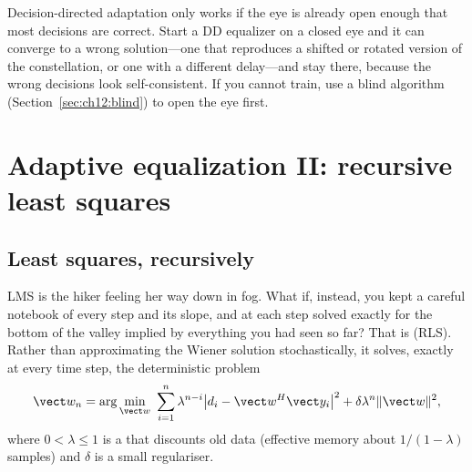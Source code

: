 
\begin{pitfall}
Decision-directed adaptation only works if the eye is already open enough that most decisions are
correct. Start a DD equalizer on a closed eye and it can converge to a wrong solution---one that
reproduces a shifted or rotated version of the constellation, or one with a different delay---and
stay there, because the wrong decisions look self-consistent. If you cannot train, use a blind
algorithm (Section~\ref{sec:ch12:blind}) to open the eye first.
\end{pitfall}

\section{Adaptive equalization II: recursive least squares}
\label{sec:ch12:rls}

\subsection{Least squares, recursively}

LMS is the hiker feeling her way down in fog. What if, instead, you kept a careful notebook of
every step and its slope, and at each step solved exactly for the bottom of the valley implied by
everything you had seen so far? That is  (RLS). Rather than
approximating the Wiener solution stochastically, it solves, exactly at every time step, the
deterministic problem
\begin{equation}
\vect w_n=\arg\min_{\vect w}\ \sum_{i=1}^{n}\lambda^{n-i}\big|d_i-\vect w^H\vect y_i\big|^2
+\delta\lambda^n\|\vect w\|^2,
\label{eq:ch12:rlscost}
\end{equation}
where $0<\lambda\le1$ is a  that discounts old data (effective memory
about $1/(1-\lambda)$ samples) and $\delta$ is a small regulariser.

